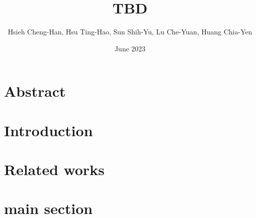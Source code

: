 \documentclass[twocolumn,10pt]{article}
\begin{document}
\title{TBD}

\author{Hsieh Cheng-Han, Hsu Ting-Hao, Sun Shih-Yu, Lu Che-Yuan, Huang Chia-Yen}
\date{June 2023}
\maketitle

\section*{Abstract}

\section{Introduction}
\label{sec:Introduction}

\section{Related works}
\label{sec:Related works}

\section{main section}
\end{document}
